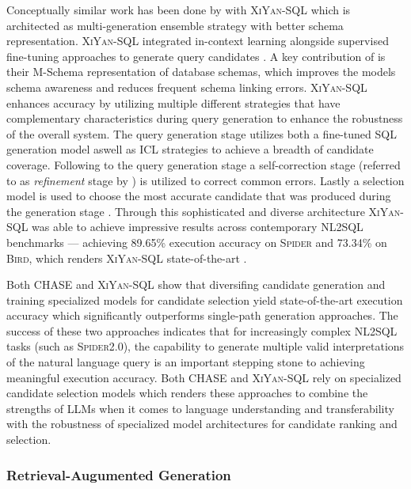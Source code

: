 Conceptually similar work has been done by \citeauthor*{XiYan} with \textsc{XiYan-SQL} which is architected as multi-generation
ensemble strategy with better schema representation. \textsc{XiYan-SQL} integrated in-context learning alongside supervised
fine-tuning approaches to generate query candidates \citep{XiYan}. A key contribution of \cite{XiYan} is their M-Schema
representation of database schemas, which improves the models schema awareness and reduces frequent schema linking errors.
\textsc{XiYan-SQL} enhances accuracy by utilizing multiple different strategies that have complementary characteristics
during query generation to enhance the robustness of the overall system. The query generation stage utilizes both a
fine-tuned SQL generation model aswell as ICL strategies to achieve a breadth of candidate coverage. Following to the query
generation stage a self-correction stage (referred to as \textit{refinement} stage by \citeauthor{XiYan}) is utilized
to correct common errors. Lastly a selection model is used to choose the most accurate candidate that was produced
during the generation stage \citep{XiYan}. Through this sophisticated and diverse architecture \textsc{XiYan-SQL} was
able to achieve impressive results across contemporary NL2SQL benchmarks — achieving 89.65\% execution accuracy on
\textsc{Spider} and 73.34\% on \textsc{Bird}, which renders \textsc{XiYan-SQL} state-of-the-art \citep{XiYan}.

Both CHASE and \textsc{XiYan-SQL} show that diversifing candidate generation and training specialized models for candidate
selection yield state-of-the-art execution accuracy which significantly outperforms single-path generation approaches.
The success of these two approaches indicates that for increasingly complex NL2SQL tasks (such as \textsc{Spider2.0}),
the capability to generate multiple valid interpretations of the natural language query is an important stepping stone
to achieving meaningful execution accuracy. Both CHASE and \textsc{XiYan-SQL} rely on specialized candidate selection
models which renders these approaches to combine the strengths of LLMs when it comes to language understanding and
transferability with the robustness of specialized model architectures for candidate ranking and selection.


\subsubsection{Retrieval-Augumented Generation}

